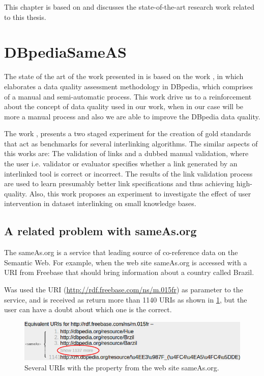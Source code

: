 This chapter is based on \cite{valdestilhasdbpediasameas, valdestilhas2017cedal, valdestilhas2018my, ValdestilhasKcap, valdestilhas2017high} and discusses the state-of-the-art research work related to this thesis.

\section{DBpediaSameAS}
The state of the art of the work presented in \cite{valdestilhasdbpediasameas} is based on the work \cite{anra2013}, in which elaborates a data quality assessment methodology in DBpedia, which comprises of a manual and semi-automatic process. This work drive us to a reinforcement about the concept of data quality used in our work, when in our case will be more a manual process and also we are able to improve the DBpedia data quality.

The work \cite{mofeed2015}, presents a two staged experiment for the creation of gold standards that act as benchmarks for several interlinking algorithms. The similar aspects of this works are: The validation of links and a dubbed manual validation, where the user i.e. validator or evaluator specifies whether a link generated by an interlinked tool is correct or incorrect. The results of the link validation process are used to learn presumably better link specifications and thus achieving high-quality.
Also, this work proposes an experiment to investigate the effect of user intervention in dataset interlinking on small knowledge bases. 

\subsection{A related problem with sameAs.org}
The sameAs.org is a service that leading source of co-reference data on the Semantic Web.
For example, when the web site sameAs.org is accessed with a URI from Freebase that should bring information about a country called Brazil.

Was used the URI (\url{http://rdf.freebase.com/ns/m.015fr}) as parameter to the service, and is received as return more than 1140 URIs as shown in \cref{fig:sameasorg}, but the user can have a doubt about which one is the correct.

\begin{figure}[hbt] 
  	\centering
	\includegraphics[width=\columnwidth]{img/sameasorg.png}
 	\caption{Several URIs with the property  from the web site sameAs.org.}
  	\label{fig:sameasorg}
\end{figure}

